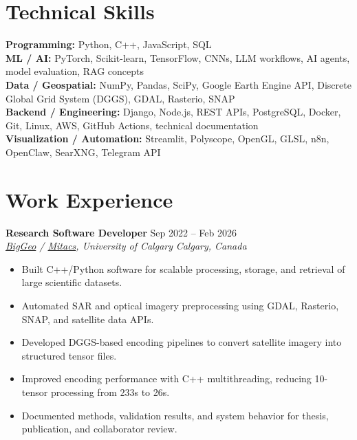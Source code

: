 \documentclass[a4paper,10pt]{article}
\newcommand{\resumeSubheading}[4]{
    \textbf{#1} \hfill #2 \\
    \textit{#3} \hfill \textit{#4}
}
\begin{document}
\section*{Technical Skills}

\textbf{Programming:} Python, C++, JavaScript, SQL \\
\textbf{ML / AI:} PyTorch, Scikit-learn, TensorFlow, CNNs, LLM workflows, AI agents, model evaluation, RAG concepts \\
\textbf{Data / Geospatial:} NumPy, Pandas, SciPy, Google Earth Engine API, Discrete Global Grid System (DGGS), GDAL, Rasterio, SNAP \\
\textbf{Backend / Engineering:} Django, Node.js, REST APIs, PostgreSQL, Docker, Git, Linux, AWS, GitHub Actions, technical documentation \\
\textbf{Visualization / Automation:} Streamlit, Polyscope, OpenGL, GLSL, n8n, OpenClaw, SearXNG, Telegram API


\section*{Work Experience}

\resumeSubheading
{Research Software Developer}
{Sep 2022 -- Feb 2026}
{\href{https://biggeo.com}{BigGeo} / \href{https://www.mitacs.ca/}{Mitacs}, University of Calgary}
{Calgary, Canada}
\begin{itemize}[leftmargin=0.25in]
    \item Built C++/Python software for scalable processing, storage, and retrieval of large scientific datasets.
    \item Automated SAR and optical imagery preprocessing using GDAL, Rasterio, SNAP, and satellite data APIs.
    \item Developed DGGS-based encoding pipelines to convert satellite imagery into structured tensor files.
    \item Improved encoding performance with C++ multithreading, reducing 10-tensor processing from 233s to 26s.
    \item Documented methods, validation results, and system behavior for thesis, publication, and collaborator review.
\end{itemize}
\end{document}
